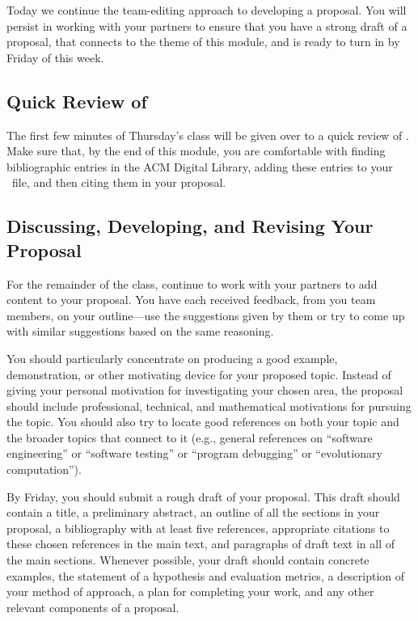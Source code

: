 
\usepackage{ulem}
\usepackage[compact]{titlesec}




Today we continue the team-editing approach to developing a proposal.  You will persist in working with your partners to
ensure that you have a strong draft of a proposal, that connects to the theme of this module, and is ready to turn in by
Friday of this week.

\subsection*{Quick Review of \BibTeX}

The first few minutes of Thursday's class will be given over to a quick review of \BibTeX. Make sure that, by the end of
this module, you are comfortable with finding bibliographic entries in the ACM Digital Library, adding these entries to
your \BibTeX\ file, and then citing them in your proposal.

\subsection*{Discussing, Developing, and Revising Your Proposal}

For the remainder of the class, continue to work with your partners to add content to your proposal. You have each
received feedback, from you team members, on your outline---use the suggestions given by them or try to come up with
similar suggestions based on the same reasoning.

You should particularly concentrate on producing a good example, demonstration, or other motivating device for your
proposed topic. Instead of giving your personal motivation for investigating your chosen area, the proposal should
include professional, technical, and mathematical motivations for pursuing the topic.  You should also try to locate
good references on both your topic and the broader topics that connect to it (e.g., general references on ``software
engineering'' or ``software testing'' or ``program debugging'' or ``evolutionary computation'').

By Friday, you should submit a rough draft of your proposal. This draft should contain a title, a preliminary abstract,
an outline of all the sections in your proposal, a bibliography with at least five references, appropriate citations to these
chosen references in the main text, and paragraphs of draft text in all of the main sections. Whenever possible, your
draft should contain concrete examples, the statement of a hypothesis and evaluation metrics, a description of
your method of approach, a plan for completing your work, and any other relevant components of a proposal.


